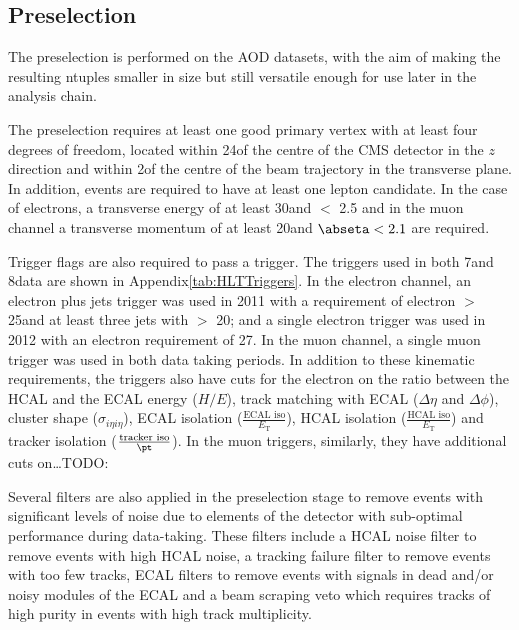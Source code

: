 \subsection{Preselection}
\label{ss:preselection}
The preselection is performed on the AOD datasets, with the aim of making the resulting ntuples smaller
in size but still versatile enough for use later in the analysis chain.

The preselection requires at least one good primary vertex with at least four degrees of freedom,
located within 24\cm of the centre of the CMS detector in the $z$ direction and within 2\cm of the centre of
the beam trajectory in the transverse plane. In addition, events are required to have at least one lepton
candidate. In the case of electrons, a transverse energy of at least 30\GeV and \abseta $<$ 2.5 and in the
muon channel a transverse momentum of at least 20\GeV and $\abseta < 2.1$ are required. 

Trigger flags are also required to pass a trigger. The triggers used in both 7\TeV and 8\TeV data are shown in
Appendix\ref{tab:HLTTriggers}. In the electron channel, an electron plus jets trigger was used in 2011 with a
requirement of electron \Et $>$ 25\GeV and at least three jets with \pt $>$ 20\GeV; and a single electron
trigger was used in 2012 with an electron \Et requirement of 27\GeV. In the muon channel, a single muon
trigger was used in both data taking periods. In addition to these kinematic requirements, the triggers also
have cuts for the electron on the ratio between the HCAL and the ECAL energy ($H/E$), track matching with ECAL
($\Delta\eta$ and $\Delta\phi$), cluster shape ($\sigma_{i\eta i\eta}$), ECAL isolation ($\frac{\text{ECAL
iso}}{E_\text{T}}$), HCAL isolation ($\frac{\text{HCAL iso}}{E_\text{T}}$) and tracker isolation
($\frac{\text{tracker iso}}{\pt}$). In the muon triggers, similarly, they have additional cuts on\ldots TODO:



Several filters are also applied in the preselection stage to remove events with significant levels of noise
due to elements of the detector with sub-optimal performance during data-taking. These filters include a HCAL
noise filter to remove events with high HCAL noise, a tracking failure filter to remove events with too few
tracks, ECAL filters to remove events with signals in dead and/or noisy modules of the ECAL and a beam
scraping veto which requires tracks of high purity in events with high track multiplicity.


